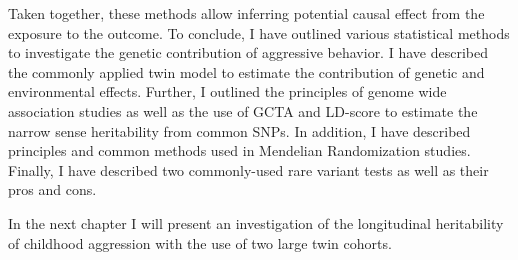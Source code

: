Taken together, these methods allow inferring potential causal effect from the exposure to the outcome.
\bigskip
To conclude, I have outlined various statistical methods to investigate the genetic contribution of aggressive behavior.
I have described the commonly applied twin model to estimate the contribution of genetic and environmental effects.
Further, I outlined the principles of genome wide association studies as well as the use of GCTA and LD-score to estimate the narrow sense heritability from common SNPs.
In addition, I have described principles and common methods used in Mendelian Randomization studies.
Finally, I have described two commonly-used rare variant tests as well as their pros and cons.

In the next chapter I will present an investigation of the longitudinal heritability of childhood aggression with the use of two large twin cohorts. 
